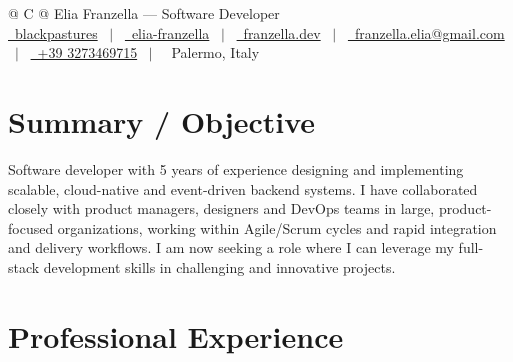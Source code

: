\documentclass[a4paper,10pt]{article}
\begin{document}
\pagestyle{empty} 


\begin{tabularx}{\linewidth}{@{} C @{}}
    \Huge{Elia Franzella --- Software Developer} \\[7.5pt]
    \href{https://github.com/blackpastures}{\raisebox{-0.05\height}\faGithub\ blackpastures} \ $|$ \ 
    \href{https://www.linkedin.com/in/elia-franzella/}{\raisebox{-0.05\height}\faLinkedin\ elia-franzella} \ $|$ \ 
    \href{https://www.franzella.dev}{\raisebox{-0.05\height}\faGlobe \ franzella.dev} \ $|$ \ 
    \href{mailto:franzella.elia@gmail.com}{\raisebox{-0.05\height}\faEnvelope \ franzella.elia@gmail.com} \ $|$ \ 
    \href{tel:+393273469715}{\raisebox{-0.05\height}\faMobile \ +39 3273469715}  \ $|$ \ 
    \raisebox{-0.05\height}\faMapMarker \ Palermo, Italy \\
\end{tabularx}


\section{Summary / Objective}
Software developer with 5 years of experience designing and implementing scalable, cloud-native and event-driven backend systems. I have collaborated closely with product managers, designers and DevOps teams in large, product-focused organizations, working within Agile/Scrum cycles and rapid integration and delivery workflows. I am now seeking a role where I can leverage my full-stack development skills in challenging and innovative projects.


\section{Professional Experience}
\end{document}
